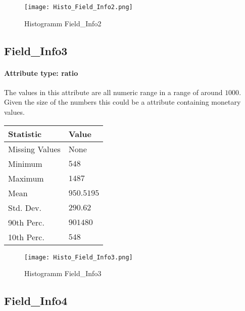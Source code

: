 \begin{figure}[H]
	\begin{center}
		\texttt{[image: Histo\_Field\_Info2.png]}
	\end{center}
	\caption{Histogramm Field\_Info2}
\end{figure}

\subsection{Field\_Info3}
\paragraph{Attribute type: ratio} The values in this attribute are all numeric range in a range of around $1000$. Given the size of the numbers this could be a attribute containing monetary values.

\begin{table}[H]
	\renewcommand{\arraystretch}{1.25}
	\begin{tabular}{l|l}
		\textbf{Statistic} & \textbf{Value}\\\hline
			Missing Values& None\\\hline
		Minimum& $548$\\\hline
		Maximum& $1487$\\\hline
		Mean& $950.5195$\\\hline
		Std. Dev.& $290.62$\\\hline
		90th Perc. & $901480$\\\hline
		10th Perc. & $548$ \\		
	\end{tabular}
\end{table}

\begin{figure}[H]
	\begin{center}
		\texttt{[image: Histo\_Field\_Info3.png]}
	\end{center}
	\caption{Histogramm Field\_Info3}
\end{figure}

\subsection{Field\_Info4}
